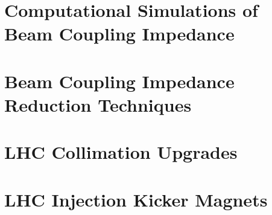 \documentclass[12pt,PhD]{Thesis}
\begin{document}
\chapter{Computational Simulations of Beam Coupling Impedance}






\chapter{Beam Coupling Impedance Reduction Techniques}










\chapter{LHC Collimation Upgrades}









\chapter{LHC Injection Kicker Magnets}
\label{chap:mki}









\end{document}
